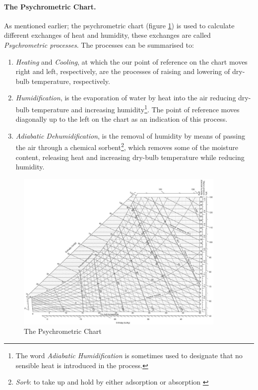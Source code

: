 \paragraph{The Psychrometric Chart.}As mentioned earlier; the psychrometric chart (figure \ref{PsychroChart}) is used to calculate different exchanges of heat and humidity, these exchanges are called \emph{Psychrometric processes}. The processes can be summarised to:
\begin{enumerate}
  \item \emph{Heating} and \emph{Cooling}, at which the our point of reference on the chart moves right and left, respectively, are the processes of raising and lowering of dry-bulb temperature, respectively.
  \item \emph{Humidification}, is the evaporation of water by heat into the air reducing dry-bulb temperature and increasing humidity\footnote{The word \emph{Adiabatic Humidification} is sometimes used to designate that no sensible heat is introduced in the process.}. The point of reference moves diagonally up to the left on the chart as an indication of this process.
  \item \emph{Adiabatic Dehumidification}, is the removal of humidity by means of passing the air through a chemical sorbent\footnote{\emph{Sorb}: to take up and hold by either adsorption or absorption \cite{merriam03}}, which removes some of the moisture content, releasing heat and increasing dry-bulb temperature while reducing humidity.
\end{enumerate}

\begin{figure} %
\centering
\includegraphics[width=0.9\textwidth]{./Images/1-PsychrometricChart}
\caption[The Psychrometric Chart]{The Psychrometric Chart \cite{szokolay08} \label{PsychroChart}}
\end{figure}

